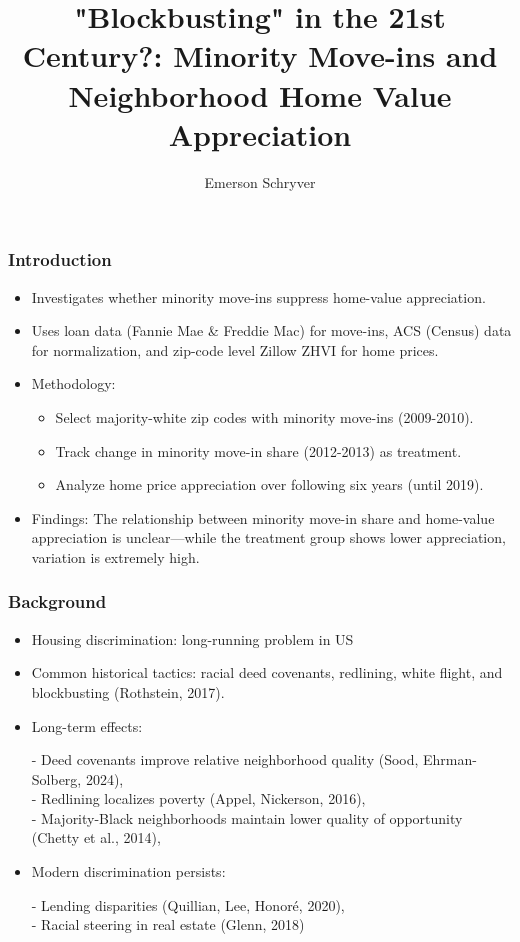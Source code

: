 \documentclass[aspectratio=169]{beamer}
\title[Minority Move-Ins and Home Appreciation]{"Blockbusting" in the 21st Century?: Minority Move-ins and Neighborhood Home Value Appreciation}
\author{Emerson Schryver}
\begin{document}
\begin{frame}
    \maketitle
\end{frame}
\begin{frame}
\frametitle{Introduction}
\begin{itemize}
    \item Investigates whether minority move-ins suppress home-value appreciation.
    \item Uses loan data (Fannie Mae \& Freddie Mac) for move-ins, ACS (Census) data for normalization, and zip-code level Zillow ZHVI for home prices.
    \item Methodology:
    \begin{itemize}
        \item Select majority-white zip codes with minority move-ins (2009-2010).
        \item Track change in minority move-in share (2012-2013) as treatment.
        \item Analyze home price appreciation over following six years (until 2019).
    \end{itemize}
    \item Findings: The relationship between minority move-in share and home-value appreciation is unclear—while the treatment group shows lower appreciation, variation is extremely high.
\end{itemize}
\end{frame}
\begin{frame}
    \frametitle{Background}
    \begin{itemize}
        \item Housing discrimination: long-running problem in US
        \item Common historical tactics: racial deed covenants, redlining, white flight, and blockbusting (Rothstein, 2017).
        \item Long-term effects:
        
        \small
        - Deed covenants improve relative neighborhood quality (Sood, Ehrman-Solberg, 2024), \\
        - Redlining localizes poverty (Appel, Nickerson, 2016), \\
        - Majority-Black neighborhoods maintain lower quality of opportunity (Chetty et al., 2014),
    
        \normalsize
        \item Modern discrimination persists:
        
        \small
        - Lending disparities (Quillian, Lee, Honoré, 2020), \\
        - Racial steering in real estate (Glenn, 2018)
        
    \end{itemize}
\end{frame}
\end{document}
